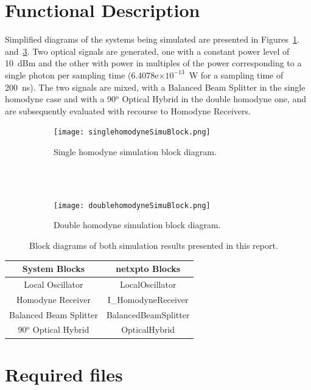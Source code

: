 \section{Functional Description}

Simplified diagrams of the systems being simulated are presented in Figures~\ref{fig:singleH}. and~\ref{fig:doubleH}. Two optical signals are generated, one with a constant power level of 10~dBm and the other with power in multiples of the power corresponding to a single photon per sampling time (6.4078e$\times10^{-13}$~W for a sampling time of 200~ns). The two signals are mixed, with a Balanced Beam Splitter in the single homodyne case and with a 90$^\text{o}$ Optical Hybrid in the double homodyne one, and are subsequently evaluated with recourse to Homodyne Receivers.

\begin{figure}[h]
\centering
\begin{subfigure}{\linewidth}
\texttt{[image: singlehomodyneSimuBlock.png]}
\caption{Single homodyne simulation block diagram.}
\label{fig:singleH}
\end{subfigure}
\\
~
\\
\begin{subfigure}{\linewidth}
\texttt{[image: doublehomodyneSimuBlock.png]}
\caption{Double homodyne simulation block diagram.}
\label{fig:doubleH}
\end{subfigure}
\caption{Block diagrams of both simulation results presented in this report.}
\end{figure}

\begin{table}[H]
\centering
\begin{tabular}{c|c}
System Blocks          & netxpto Blocks       \\ \hline
Local Oscillator       & LocalOscillator      \\
Homodyne Receiver      & I\_HomodyneReceiver   \\
Balanced Beam Splitter & BalancedBeamSplitter \\
90$^\text{o}$ Optical Hybrid     & OpticalHybrid
\end{tabular}
\end{table}

\pagebreak
\section{Required files}\label{Required files}

